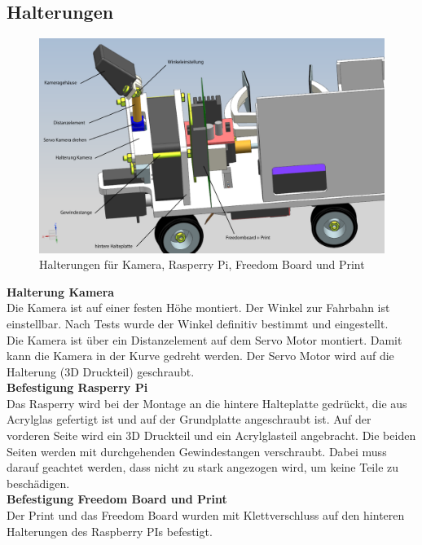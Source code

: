\subsection{Halterungen}
\begin{figure}[H]
\centering
\includegraphics[width=1\textwidth]{03_Loesungskonzept/pictures/halterungen2.png}
\caption{Halterungen für Kamera, Rasperry Pi, Freedom Board und Print}
\end{figure}
\textbf{Halterung Kamera}\\[0.2cm]
Die Kamera ist auf einer festen Höhe montiert. Der Winkel zur Fahrbahn ist einstellbar. Nach Tests wurde der Winkel definitiv bestimmt und eingestellt.\\[0.2cm]
Die Kamera ist über ein Distanzelement auf dem Servo Motor montiert. Damit kann die Kamera in der Kurve gedreht werden. Der Servo Motor wird auf die Halterung (3D Druckteil) geschraubt.\\[0.2cm]
\textbf{Befestigung Rasperry Pi}\\[0.2cm]
Das Rasperry wird bei der Montage an die hintere Halteplatte gedrückt, die aus Acrylglas gefertigt ist und auf der Grundplatte angeschraubt ist. Auf der vorderen Seite wird ein 3D Druckteil und ein Acrylglasteil angebracht. Die beiden Seiten werden mit durchgehenden Gewindestangen verschraubt. Dabei muss darauf geachtet werden, dass nicht zu stark angezogen wird, um keine Teile zu beschädigen.\\[0.2cm]
\newpage
\textbf{Befestigung Freedom Board und Print}\\[0.2cm]
Der Print und das Freedom Board wurden mit Klettverschluss auf den hinteren Halterungen des Raspberry PIs befestigt.\\[0.2cm]
